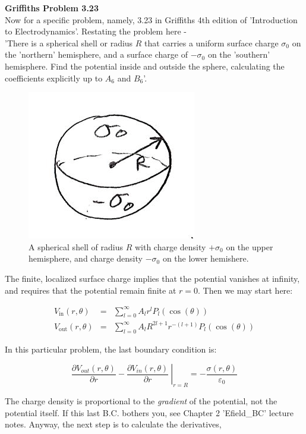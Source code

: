 \documentclass[12pt]{article}
\begin{document}
\begin{flushleft}
\textbf{\color{myblue} Griffiths Problem 3.23}\\
Now for a specific problem, namely, 3.23 in Griffiths 4th edition of 'Introduction to Electrodynamics'.  Restating the problem here - \\
\vspace{.1in}
'There is a spherical shell or radius $R$ that carries a uniform surface charge $\sigma_{0}$ on the 'northern' hemisphere, and a surface charge of $-\sigma_{0}$ on the 'southern' hemisphere.  Find the potential inside and outside the sphere, calculating the coefficients explicitly up to $A_{6}$ and $B_{6}$'.  

\begin{figure}[h]
\centering
\includegraphics*[trim=0cm 0cm 0cm 0cm, clip=true, width=0.3\columnwidth]{hemis.png}
\caption{\small A spherical shell of radius $R$ with charge density $+\sigma_{0}$ on the upper hemisphere, and charge density $-\sigma_{0}$ on the lower hemishere.}
\label{fig:lns}
\end{figure}

The finite, localized surface charge implies that the potential vanishes at infinity, and requires that the potential remain finite at $r=0$.  Then we may start here:

\begin{eqnarray*}
V_{\text{in}}(r,\theta) & = & \sum_{l=0}^{\infty} A_{l}r^{l} P_{l}(\cos{(\theta)}) \\
V_{\text{out}}(r,\theta) &  = & \sum_{l=0}^{\infty} A_{l}R^{2l+1}r^{-(l+1)} P_{l}(\cos{(\theta)})
\end{eqnarray*}


In this particular problem, the last boundary condition is:

\begin{equation}
\left. \frac{\partial V_{out}(r,\theta)}{\partial r} - \frac{\partial V_{in}(r,\theta)}{\partial r} \: \right\vert_{r=R}= -\frac{\sigma(r,\theta) }{\varepsilon_{0}}
\label{eq:lastbc}
\end{equation}

The charge density is proportional to the \textit{gradient} of the potential, not the potential itself.  If this last B.C. bothers you, see Chapter 2 'Efield\_BC' lecture notes.  Anyway, the next step is to calculate the derivatives,


\end{flushleft}
\end{document}
